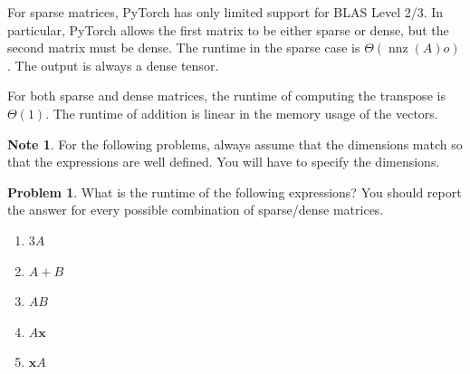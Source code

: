 \documentclass[10pt]{article}
\theoremstyle{definition}
\newtheorem{problem}{Problem}
\newtheorem{note}{Note}
\DeclareMathOperator{\nnz}{nnz}
\newcommand{\trans}[1]{{#1}^{T}}
\newcommand{\x}{\mathbf x}
\begin{document}
For sparse matrices, PyTorch has only limited support for BLAS Level 2/3.
In particular, PyTorch allows the first matrix to be either sparse or dense,
but the second matrix must be dense.
The runtime in the sparse case is $\Theta(\nnz(A)o)$.
The output is always a dense tensor.

For both sparse and dense matrices,
the runtime of computing the transpose is $\Theta(1)$.
The runtime of addition is linear in the memory usage of the vectors.

\begin{note}
For the following problems, always assume that the dimensions match so that the expressions are well defined.
You will have to specify the dimensions.
\end{note}

\begin{problem}
    What is the runtime of the following expressions?
    You should report the answer for every possible combination of sparse/dense matrices.

    \begin{enumerate}
        \item
            $3A$
            \vspace{2in}
        \item
            $A + B$
            \vspace{2in}
        \item
            $AB$
            \vspace{3in}
        \item
            $A\x$
            \vspace{3in}
        \item
            $\x A$
            \vspace{3in}
    \end{enumerate}
\end{problem}

\end{document}

